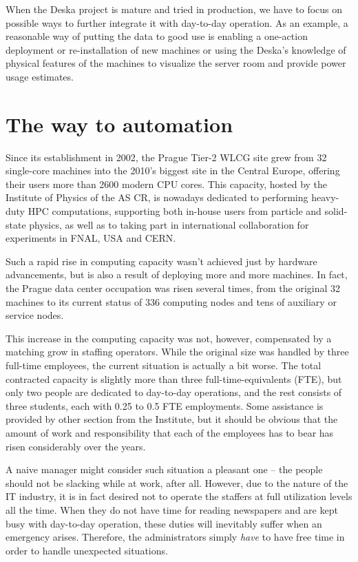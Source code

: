 \documentclass[11pt]{article}
\begin{document}
When the Deska project is mature and tried in production, we have to focus on
possible ways to further integrate it with day-to-day operation.  As an example,
a reasonable way of putting the data to good use is enabling a one-action
deployment or re-installation of new machines or using the Deska's knowledge of
physical features of the machines to visualize the server room and provide power
usage estimates.


\section{The way to automation}

Since its establishment in 2002, the Prague Tier-2 WLCG site grew from 32
single-core machines into the 2010's biggest site in the Central Europe,
offering their users more than 2600 modern CPU cores.  This capacity, hosted by
the Institute of Physics of the AS CR, is nowadays dedicated to performing
heavy-duty HPC computations, supporting both in-house users from particle and
solid-state physics, as well as to taking part in international collaboration
for experiments in FNAL, USA and CERN.

Such a rapid rise in computing capacity wasn't achieved just by hardware
advancements, but is also a result of deploying more and more machines. In fact,
the Prague data center occupation was risen several times, from the
original 32 machines to its current status of 336 computing nodes and tens of
auxiliary or service nodes.

This increase in the computing capacity was not, however, compensated by a
matching grow in staffing operators.  While the original size was handled by
three full-time employees, the current situation is actually a bit worse.  The
total contracted capacity is slightly more than three full-time-equivalents
(FTE), but only two people are dedicated to day-to-day operations, and the rest
consists of three students, each with 0.25 to 0.5 FTE employments.  Some
assistance is provided by other section from the Institute, but it should be
obvious that the amount of work and responsibility that each of the employees
has to bear has risen considerably over the years.

A naive manager might consider such situation a pleasant one -- the people
should not be slacking while at work, after all.  However, due to the nature of
the IT industry, it is in fact desired not to operate the staffers at full
utilization levels all the time.  When they do not have time for reading
newspapers and are kept busy with day-to-day operation, these duties will
inevitably suffer when an emergency arises.  Therefore, the administrators
simply {\em have} to have free time in order to handle unexpected situations.
\end{document}

